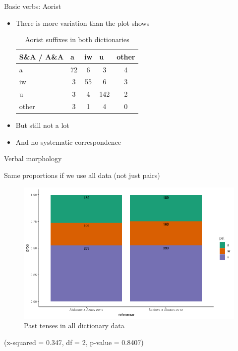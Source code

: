 \begin{frame}{Basic verbs: Aorist}
\begin{itemize}
    \item There is more variation than the plot shows

\begin{table}[]
\caption{Aorist suffixes in both dictionaries}
\label{tab:pstcorr}
\begin{tabular}{l|cccc}
S\&A / A\&A & \multicolumn{1}{l}{a} & \multicolumn{1}{l}{iw} & \multicolumn{1}{l}{u} & \multicolumn{1}{l}{other} \\ \hline
a           & 72                    & 6                      & 3                     & 4                         \\
iw          & 3                     & 55                     & 6                     & 3                         \\
u           & 3                     & 4                      & 142                   & 2                         \\
other       & 3                     & 1                      & 4                     & 0                        
\end{tabular}
\end{table}
\pause
\vfill
\item But still not a lot
\item And no systematic correspondence
\end{itemize}
\end{frame}

\begin{frame}{Verbal morphology}

Same proportions if we use all data (not just pairs)

\begin{figure}[h]
\centering
\caption{Past tenses in all dictionary data}
\includegraphics[scale=0.4]{images/pstfull.png} %
\end{figure}

\small (x-squared = 0.347, df = 2, p-value = 0.8407) %

\end{frame}


